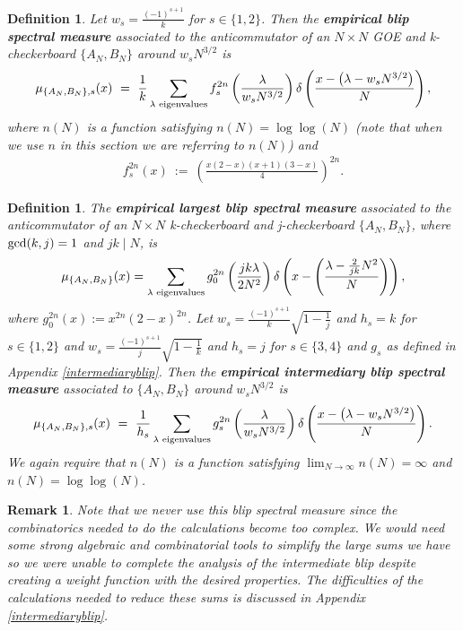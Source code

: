\documentclass[11pt,reqno]{amsart}
\numberwithin{equation}{section}
\theoremstyle{plain}
\newtheorem{definition}[thm]{Definition}
\newtheorem{remark}[thm]{Remark}
\begin{document}
\begin{definition}
Let $w_s=\frac{(-1)^{s+1}}{k}$ for $s\in \{1,2\}$. Then the \textbf{empirical blip spectral measure} associated to the anticommutator of an $N\times N$ GOE and k-checkerboard $\{A_N,B_N\}$ around $w_sN^{3/2}$ is
\begin{align}
\mu_{\{A_N,B_N\},s}(x) \ = \ \frac{1}{k}\sum_{\lambda\textup{ eigenvalues}}f_s^{2n}\left(\frac{\lambda}{w_sN^{3/2}}\right)\delta\left(\frac{x-\left(\lambda-w_sN^{3/2}\right)}{N}\right),
\end{align}
where $n(N)$ is a function satisfying $n(N)=\log\log(N)$ (note that when we use $n$ in this section we are referring to $n(N)$) and
\begin{align}
f_s^{2n}(x) \ := \ \left(\frac{x(2-x)(x+1)(3-x)}{4}\right)^{2n}.
\end{align}
\end{definition}

\begin{definition}
The \textbf{empirical largest blip spectral measure} associated to the anticommutator of an $N\times N$ k-checkerboard and j-checkerboard  $\{A_N, B_N\}$, where $\textup{gcd}(k,j)=1$ and $jk\mid N$, is
\begin{align}
\mu_{\{A_N,B_N\}}(x)=\sum_{\lambda\textup{ eigenvalues}}g_0^{2n}\left(\frac{jk\lambda}{2N^2}\right)\delta\left(x-\left(\frac{\lambda-\frac{2}{jk}N^2}{N}\right)\right),
\end{align}
where $g^{2n}_0(x):=x^{2n}(2-x)^{2n}$.
Let $w_s=\frac{(-1)^{s+1}}{k}\sqrt{1-\frac{1}{j}}$ and $h_s=k$ for $s\in \{1, 2\}$ and $w_s=\frac{(-1)^{s+1}}{j}\sqrt{1-\frac{1}{k}}$ and $h_s=j$ for $s\in \{3, 4\}$ and $g_s$ as defined in Appendix \ref{intermediaryblip}. Then the \textbf{empirical intermediary blip spectral measure} associated to $\{A_N, B_N\}$ around $w_sN^{3/2}$ is
\begin{align}
\mu_{\{A_N, B_N\}, s}(x) \ = \ \frac{1}{h_s}\sum_{\lambda\textup{ eigenvalues}}g_s^{2n}\left(\frac{\lambda}{w_sN^{3/2}}\right)\delta\left(\frac{x-\left(\lambda-w_sN^{3/2}\right)}{N}\right).
\end{align}
We again require that $n(N)$ is a function satisfying $\lim_{N\rightarrow\infty}n(N)=\infty$ and $n(N)=\log\log(N)$.
\end{definition}

\begin{remark}
Note that we never use this blip spectral measure since the combinatorics needed to do the calculations become too complex. We would need some strong algebraic and combinatorial tools to simplify the large sums we have so we were unable to complete the analysis of the intermediate blip despite creating a weight function with the desired properties. The difficulties of the calculations needed to reduce these sums is discussed in Appendix \ref{intermediaryblip}.
\end{remark}
\end{document}
